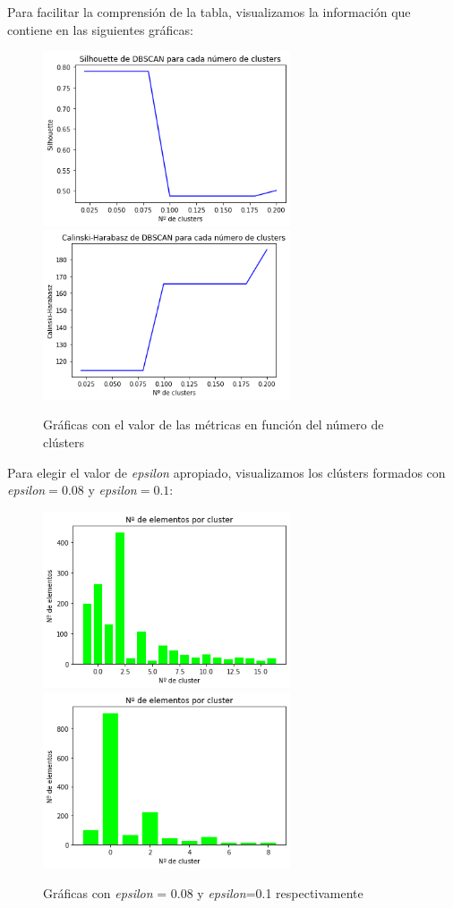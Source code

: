 \documentclass[a4]{article}
\begin{document}
Para facilitar la comprensión de la tabla, visualizamos la información que contiene en las siguientes gráficas:

\begin{figure}[H]
  \centering
  \caption{Gráficas con el valor de las métricas en función del número de clústers}
  \includegraphics[width=73mm]{imagenes/c1_dbscan_sil}
  \includegraphics[width=73mm]{imagenes/c1_dbscan_cal}
\end{figure}

Para elegir el valor de \textit{epsilon} apropiado, visualizamos los clústers formados con \textit{epsilon}$ = 0.08$ y \textit{epsilon}$=0.1$:

\begin{figure}[H]
  \centering
  \caption{Gráficas con \textit{epsilon} = 0.08 y \textit{epsilon}=0.1 respectivamente}
  \includegraphics[width=73mm]{imagenes/c1_dbscan_cluster_008}
  \includegraphics[width=73mm]{imagenes/c1_dbscan_cluster_01}
\end{figure}
\end{document}
